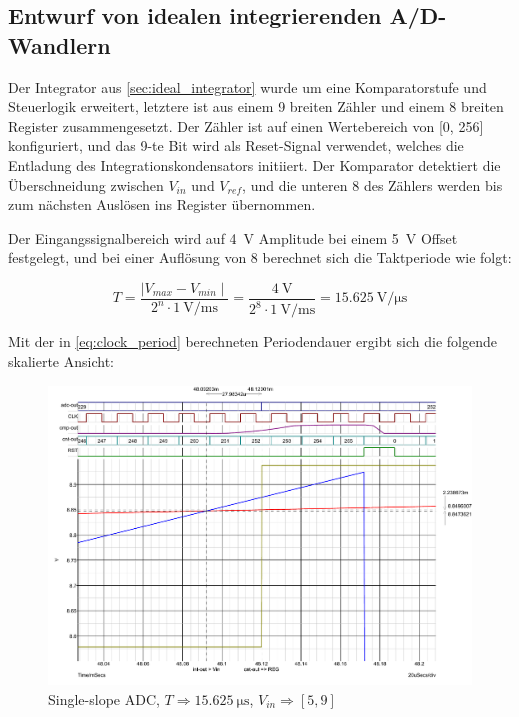 \documentclass[
	ngerman,
	parskip=half,
	twocolumn,
	DIV=calc,
	]{scrartcl}
\begin{document}
		\subsection{Entwurf von idealen integrierenden A/D-Wandlern}
		
		\label{sec:single-slope-adc}		
	
		Der Integrator aus \cref{sec:ideal_integrator} wurde um eine Komparatorstufe und Steuerlogik erweitert, letztere ist aus einem \SI{9}{\bit} breiten Zähler und einem  \SI{8}{\bit} breiten Register zusammengesetzt. 
		Der Zähler ist auf einen Wertebereich von [0, 256] konfiguriert, und das 9-te Bit wird als Reset-Signal verwendet, welches die Entladung des Integrationskondensators initiiert.
		Der Komparator detektiert die Überschneidung zwischen $V_{in}$ und $V_{ref}$, und die unteren \SI{8}{\bit} des Zählers werden bis zum nächsten Auslösen ins Register übernommen.
		
		Der Eingangssignalbereich wird auf \SI{4}{\volt} Amplitude bei einem \SI{5}{\volt} Offset  festgelegt, und bei einer Auflösung von \SI{8}{\bit} berechnet sich die Taktperiode wie folgt: 
		
		\begin{equation}
		\label{eq:clock_period}
		T = \frac{\mid V_{max} - V_{min} \mid}{2^n  \cdot \SI{1}{\volt\per\milli\second}} = \frac{\SI{4}{\volt}}{2^8 \cdot \SI{1}{\volt\per\milli\second}} = \SI{15.625}{\volt\per\micro\second}	
		\end{equation}
		
		
		Mit der in \cref{eq:clock_period} berechneten Periodendauer ergibt sich die folgende skalierte Ansicht: 
		
		\begin{figure}[h!]
			\centering
			\includegraphics[width=\linewidth]{ideal_single_slope_odd_freq_comparator_slew_rate_wide}
			\caption[Single-slope ADC (T = \SI{15.625}{\micro\second})]{Single-slope ADC, $T \Rightarrow \SI{15.625}{\micro\second}$, $V_{in} \Rightarrow [5,  9]$}
			\label{fig:single-slope-ideal-slew-rate}
		\end{figure}	
	
\end{document}
